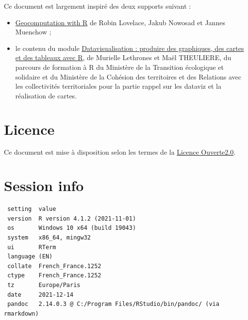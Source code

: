 \documentclass[
]{book}
\begin{document}
Ce document est largement inspiré des deux supports suivant :

\begin{itemize}
\item
  \href{https://geocompr.robinlovelace.net/}{Geocomputation with R} de Robin Lovelace, Jakub Nowosad et Jannes Muenchow ;
\item
  le contenu du module \href{https://rawgit.com/MTES-MCT/parcours-r/master/Supports_formations/m5_valorisation_des_donnees/_book/index.html}{Datavisualisation : produire des graphiques, des cartes et des tableaux avec R}, de Murielle Lethrones et Maël THEULIERE, du parcours de formation à R du Ministère de la Transition écologique et solidaire et du Ministère de la Cohésion des territoires et des Relations avec les collectivités territoriales pour la partie rappel sur les dataviz et la réalisation de cartes.
\end{itemize}

\hypertarget{licence}{%
\section*{Licence}\label{licence}}

Ce document est mise à disposition selon les termes de la \href{https://www.etalab.gouv.fr/wp-content/uploads/2017/04/ETALAB-Licence-Ouverte-v2.0.pdf}{Licence Ouverte2.0}.

\hypertarget{session-info}{%
\section*{Session info}\label{session-info}}

\begin{verbatim}
 setting  value
 version  R version 4.1.2 (2021-11-01)
 os       Windows 10 x64 (build 19043)
 system   x86_64, mingw32
 ui       RTerm
 language (EN)
 collate  French_France.1252
 ctype    French_France.1252
 tz       Europe/Paris
 date     2021-12-14
 pandoc   2.14.0.3 @ C:/Program Files/RStudio/bin/pandoc/ (via rmarkdown)
\end{verbatim}
\end{document}

